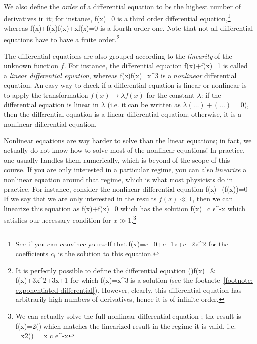 We also define the \emph{order} of a differential equation to be the highest number of derivatives in it; for instance,
\be 
{}f(x)=0
\ee 
is a third order differential equation,\footnote{
See if you can convince yourself that 
\be 
f(x)=c_0+c_1x+c_2x^2
\ee 
for the coefficients $c_i$ is the solution to this equation.
} whereas
\be 
{}f(x)+f(x)f(x)+xf(x)=0
\ee 
is a fourth order one. Note that not all differential equations have to have a finite order.\footnote{
It is perfectly possible to define the differential equation
\be 
\exp()f(x)={}& f(x)+3x^2+3x+1
\ee 
for which 
\be 
f(x)=x^3
\ee 
is a solution (see the footnote~\ref{footnote: exponentiated differential}). However, clearly, this differential equation has arbitrarily high numbers of derivatives, hence it is of infinite order.
}

The differential equations are also grouped according to the \emph{linearity} of the unknown function $f$. For instance, the differential equation
\be 
{}f(x)+f(x)=1
\ee 
is called a \emph{linear differential equation}, whereas
\be 
f(x)f(x)=x^3
\ee 
is a \emph{nonlinear} differential equation. An easy way to check if a differential equation is linear or nonlinear is to apply the transformation $f(x)\rightarrow \lambda f(x)$ for the constant $\lambda$: if the differential equation is linear in $\lambda$ (i.e. it can be written as $\lambda(\dots)+(\dots)=0$), then the differential equation is a linear differential equation; otherwise, it is a nonlinear differential equation.

Nonlinear equations are way harder to solve than the linear equations; in fact, we actually do not know how to solve most of the nonlinear equations! In practice, one usually handles them numerically, which is beyond of the scope of this course. If you are only interested in a particular regime, you can also \emph{linearize} a nonlinear equation around that regime, which is what most physicists do in practice. For instance, consider the nonlinear differential equation
\be 
\label{eq: nonlinear example}
f(x)+\sin(f(x))=0
\ee 
If we say that we are only interested in the results $f(x)\ll1$, then we can linearize this equation as 
\be 
{}f(x)+f(x)=0
\ee 
which has the solution
\be 
f(x)=c e^{-x}
\ee 
which satisfies our necessary condition for $x\gg 1$.\footnote{
We can actually solve the full nonlinear differential equation ; the result is
\be 
f(x)=2\arccot()
\ee 
which matches the linearized result in the regime it is valid, i.e. 
\be 
\lim\limits_{x\rightarrow\infty}2\arccot()=\lim\limits_{x\rightarrow\infty} c e^{-x}
\ee 
}

